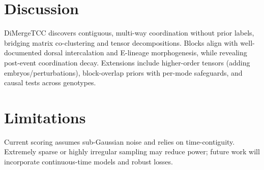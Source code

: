 \documentclass[unnumsec,webpdf,modern,large,namedate]{oup-authoring-template}%
\theoremstyle{thmstyleone}\newtheorem{theorem}{Theorem}
\theoremstyle{thmstyletwo}\newtheorem{example}{Example}
\theoremstyle{thmstylethree}\newtheorem{definition}{Definition}
\begin{document}
\section{Discussion}\label{sec:discussion}
DiMergeTCC discovers contiguous, multi-way coordination without prior labels, bridging matrix co-clustering and tensor decompositions. Blocks align with well-documented dorsal intercalation and E-lineage morphogenesis, while revealing post-event coordination decay. Extensions include higher-order tensors (adding embryos/perturbations), block-overlap priors with per-mode safeguards, and causal tests across genotypes.

\section{Limitations}\label{sec:limits}
Current scoring assumes sub-Gaussian noise and relies on time-contiguity. Extremely sparse or highly irregular sampling may reduce power; future work will incorporate continuous-time models and robust losses.



\end{document}
